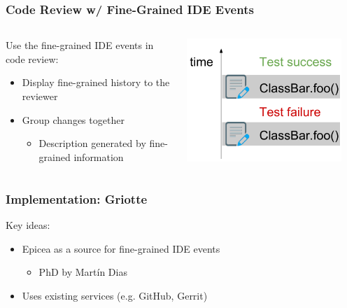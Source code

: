 \documentclass[aspectratio=169]{beamer}
\begin{document}
\begin{frame}[fragile]

\frametitle{Code Review w/ Fine-Grained IDE Events}

\begin{columns}

\begin{column}{0.5\textwidth}

Use the fine-grained IDE events in code review:

\begin{itemize}
\item Display fine-grained history to the reviewer
\item Group changes together
\begin{itemize}
\item Description generated by fine-grained information
\end{itemize}

\end{itemize}
\end{column}

\begin{column}{0.5\textwidth}

\begin{center}
\includegraphics[width=0.9\textwidth]{img/example_log.pdf}\end{center}

\end{column}

\end{columns}

\end{frame}

\begin{frame}[fragile]

\frametitle{Implementation: Griotte}

Key ideas:

\begin{itemize}
\item Epicea as a source for fine-grained IDE events
\begin{itemize}
\item PhD by Mart\'{i}n Dias
\end{itemize}

\item Uses existing services (e.g. GitHub, Gerrit)
\end{itemize}
\end{frame}
\end{document}
